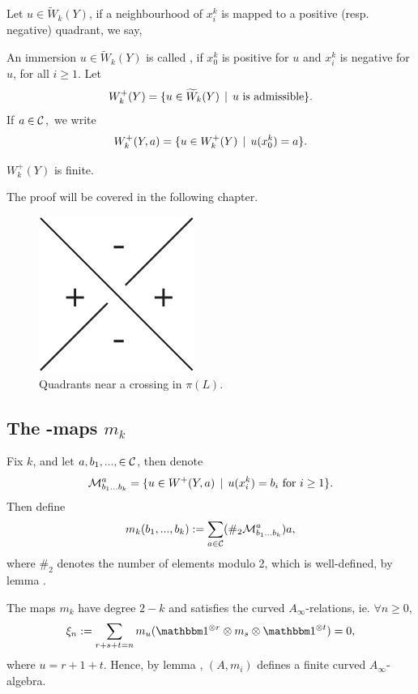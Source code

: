 \begin{defn}
Let $u \in \tilde{W}_k(Y)$, if a neighbourhood of $x^k_i$ is mapped to a positive
(resp. negative) quadrant, we say, 

An immersion $u \in \tilde{W}_k(Y)$ is called , if $x^k_0$ is
positive for $u$ and $x^k_i$ is negative for $u$, for all $i \ge 1$.
Let
\[ W_k^+(Y) = \{ u \in \widetilde{W}_k(Y) \:\:|\:\: u \text{ is admissible} \}. \]
If $a \in \mathcal{C}$, we write 
\[ W_k^+(Y,a) = \{ u \in W_k^+(Y) \:\:|\:\: u(x^k_0) = a \}. \]
\end{defn}

\begin{lemma}
\label{prop:W_+_finite}
$W^+_k(Y)$ is finite.
\end{lemma}
The proof will be covered in the following chapter.

\begin{figure}[ht]
  \centering
  \includegraphics[width=.4\textwidth]{figs/cornerasy.pdf}
  \caption{Quadrants near a crossing in $\pi(L).$}
  \label{fig:quad_sign}
\end{figure}

\subsection{The \Ainf-maps $m_k$}
\label{sect:Ainf_m}

Fix $k$, and let $a, b_1, ...,  \in \mathcal{C}$, then denote
\[ \mathcal{M}^a_{b_1...b_k} = \{ u \in W^+(Y,a) \:\:|\:\:  u(x^k_i) = b_i \text{ for } i\ge 1 \}. \]
Then define
\[ m_k(b_1, ..., b_k) := \sum_{a\in\mathcal{C}} (\#_2 \mathcal{M}^a_{b_1...b_k}) a, \]
where $\#_2$ denotes the number of elements modulo 2, which is well-defined, by
lemma .

\begin{them}
\label{prop:a_inf_rels}
The maps $m_k$ have degree $2-k$ and satisfies the curved $A_\infty$-relations,
ie. $\forall n\ge 0$,
\begin{equation}
\label{eq:a_inf_rel}
\xi_n := 
\sum_{r+s+t = n} m_u(\I^{\otimes r} \otimes m_s \otimes \I^{\otimes t})  = 0,  
\end{equation}
where $u = r+1+t$. Hence, by lemma , $(A,m_i)$ defines a
finite curved $A_\infty$-algebra.
\end{them}

